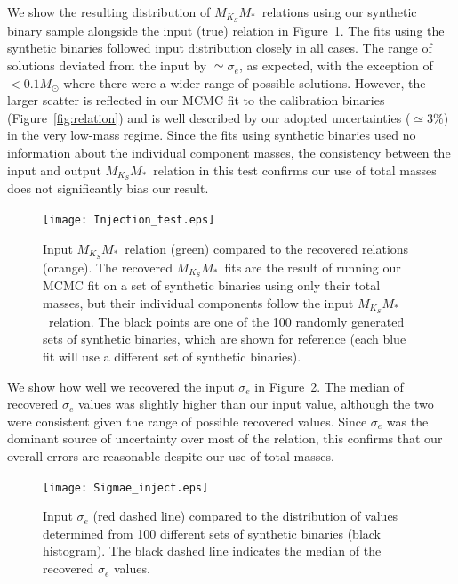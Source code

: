 \documentclass[twocolumn]{aastex62}
\newcommand{\mmk}{$M_{K_S}$\textendash$M_*$}
\begin{document}
We show the resulting distribution of \mmk\ relations using our synthetic binary sample alongside the input (true) relation in Figure~\ref{fig:inject}. The fits using the synthetic binaries followed input distribution closely in all cases. The range of solutions deviated from the input by $\simeq\sigma_e$, as expected, with the exception of $<0.1M_\odot$ where there were a wider range of possible solutions. However, the larger scatter is reflected in our MCMC fit to the calibration binaries (Figure~\ref{fig:relation}) and is well described by our adopted uncertainties ($\simeq3\%$) in the very low-mass regime. Since the fits using synthetic binaries used no information about the individual component masses, the consistency between the input and output \mmk\ relation in this test confirms our use of total masses does not significantly bias our result.

\begin{figure}[h]
\begin{center}
\texttt{[image: Injection\_test.eps]}
\caption{Input \mmk\ relation (green) compared to the recovered relations (orange). The recovered \mmk\ fits are the result of running our MCMC fit on a set of synthetic binaries using only their total masses, but their individual components follow the input \mmk\ relation. The black points are one of the 100 randomly generated sets of synthetic binaries, which are shown for reference (each blue fit will use a different set of synthetic binaries). }
\label{fig:inject}
\end{center}
\end{figure}

We show how well we recovered the input $\sigma_e$ in Figure~\ref{fig:sigetest}. The median of recovered $\sigma_e$ values was slightly higher than our input value, although the two were consistent given the range of possible recovered values. Since $\sigma_e$ was the dominant source of uncertainty over most of the relation, this confirms that our overall errors are reasonable despite our use of total masses. 

\begin{figure}[h]
\begin{center}
\texttt{[image: Sigmae\_inject.eps]}
\caption{Input $\sigma_e$ (red dashed line) compared to the distribution of values determined from 100 different sets of synthetic binaries (black histogram). The black dashed line indicates the median of the recovered $\sigma_e$ values. }
\label{fig:sigetest}
\end{center}
\end{figure}
\end{document}
